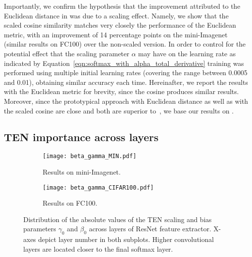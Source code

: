 \documentclass{article}
\begin{document}
Importantly, we confirm the hypothesis that the improvement attributed to the Euclidean distance in \cite{snell2017prototypical} was due to a scaling effect. Namely, we show that the scaled cosine similarity matches very closely the performance of the Euclidean metric, with an improvement of 14 percentage points on the mini-Imagenet (similar results on FC100) over the non-scaled version. In order to control for the potential effect that the scaling parameter $\alpha$ may have on the learning rate as indicated by Equation~\eqref{eqn:softmax_with_alpha_total_derivative} training was performed using multiple initial learning rates (covering the range between 0.0005 and 0.01), obtaining similar accuracy each time.  Hereinafter, we report the results with the Euclidean metric for brevity, since the cosine produces similar results. Moreover, since the prototypical approach with Euclidean distance as well as with the scaled cosine are close and both are superior to~\cite{vinyals2016matching}, we base our results on \cite{snell2017prototypical}.




\subsection{TEN importance across layers} \label{ssec:tbn_importance_vs_depth}

\begin{figure}[t]
    \centering
    \begin{subfigure}[t]{0.49\textwidth}
        \texttt{[image: beta\_gamma\_MIN.pdf]}
        \caption{Results on mini-Imagenet.}
        \label{fig:tbn_scaling_miniimagenet}
    \end{subfigure}
    \begin{subfigure}[t]{0.49\textwidth}
        \texttt{[image: beta\_gamma\_CIFAR100.pdf]}
        \caption{Results on FC100.}
        \label{fig:tbn_scaling_cifar100}
    \end{subfigure}
    \caption{Distribution of the absolute values of the TEN scaling and bias parameters $\gamma_0$ and $\beta_0$ across layers of ResNet feature extractor. X-axes depict layer number in both subplots. Higher convolutional layers are located closer to the final softmax layer.}
    \label{fig:tbn_scaling}
\end{figure}
\end{document}
